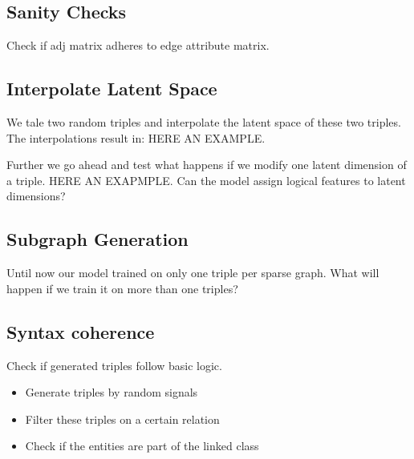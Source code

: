 
\subsection{Sanity Checks}
Check if adj matrix adheres to edge attribute matrix.

\subsection{Interpolate Latent Space}
We tale two random triples and interpolate the latent space of these two triples. The interpolations result in: HERE AN EXAMPLE.

Further we go ahead and test what happens if we modify one latent dimension of a triple. HERE AN EXAPMPLE.
Can the model assign logical features to latent dimensions?

\subsection{Subgraph Generation}
Until now our model trained on only one triple per sparse graph. What will happen if we train it on more than one triples?

\subsection{Syntax coherence}
Check if generated triples follow basic logic.
\begin{itemize}
    \item Generate triples by random signals
    \item Filter these triples on a certain relation
    \item Check if the entities are part of the linked class
\end{itemize}

